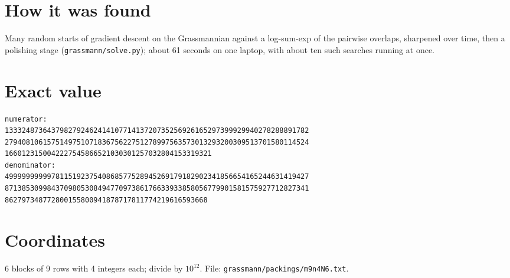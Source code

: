 \documentclass[11pt,a4paper]{article}
\begin{document}
\section{How it was found}
Many random starts of gradient descent on the Grassmannian against a log-sum-exp of the pairwise overlaps, sharpened over time, then a polishing stage (\texttt{grassmann/solve.py}); about 61 seconds on one laptop, with about ten such searches running at once.


\appendix
\section{Exact value}
{\small
\begin{verbatim}
numerator:
133324873643798279246241410771413720735256926165297399929940278288891782
279408106157514975107183675622751278997563573013293200309513701580114524
1660123150042227545866521030301257032804153319321
denominator:
499999999997811519237540868577528945269179182902341856654165244631419427
871385309984370980530849477097386176633933858056779901581575927712827341
862797348772800155800941878717811774219616593668
\end{verbatim}}

\section{Coordinates}
6 blocks of 9 rows with 4 integers each; divide by $10^{12}$. File: \texttt{grassmann/packings/m9n4N6.txt}.
{\tiny
\begin{multicols}{3}
\end{multicols}}
\end{document}
